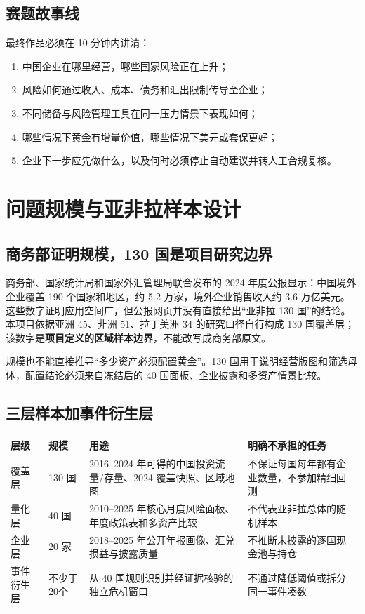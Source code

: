 \documentclass[UTF8,12pt,openany]{ctexbook}
\begin{document}
\section{赛题故事线}
最终作品必须在 10 分钟内讲清：

\begin{enumerate}
  \item 中国企业在哪里经营，哪些国家风险正在上升；
  \item 风险如何通过收入、成本、债务和汇出限制传导至企业；
  \item 不同储备与风险管理工具在同一压力情景下表现如何；
  \item 哪些情况下黄金有增量价值，哪些情况下美元或套保更好；
  \item 企业下一步应先做什么，以及何时必须停止自动建议并转人工合规复核。
\end{enumerate}

\chapter{问题规模与亚非拉样本设计}

\section{商务部证明规模，130 国是项目研究边界}
商务部、国家统计局和国家外汇管理局联合发布的 2024 年度公报显示：中国境外企业覆盖 190 个国家和地区，约 5.2 万家，境外企业销售收入约 3.6 万亿美元\autocite{mofcom2024ofdi}。这些数字证明应用空间广，但公报网页并没有直接给出“亚非拉 130 国”的结论。本项目依据亚洲 45、非洲 51、拉丁美洲 34 的研究口径自行构成 130 国覆盖层；该数字是\textbf{项目定义的区域样本边界}，不能改写成商务部原文。

规模也不能直接推导“多少资产必须配置黄金”。130 国用于说明经营版图和筛选母体，配置结论必须来自冻结后的 40 国面板、企业披露和多资产情景比较。

\section{三层样本加事件衍生层}
\begin{longtable}{p{2.8cm}p{2.0cm}p{4.6cm}p{4.6cm}}
\toprule
\textbf{层级} & \textbf{规模} & \textbf{用途} & \textbf{明确不承担的任务}\\
\midrule
覆盖层 & 130 国 & 2016--2024 年可得的中国投资流量/存量、2024 覆盖快照、区域地图 & 不保证每国每年都有企业数量，不参加精细回测\\
量化层 & 40 国 & 2010--2025 年核心月度风险面板、年度政策表和多资产比较 & 不代表亚非拉总体的随机样本\\
企业层 & 20 家 & 2018--2025 年公开年报画像、汇兑损益与披露质量 & 不推断未披露的逐国现金池与持仓\\
事件衍生层 & 不少于20个 & 从 40 国规则识别并经证据核验的独立危机窗口 & 不通过降低阈值或拆分同一事件凑数\\
\bottomrule
\end{longtable}
\end{document}

